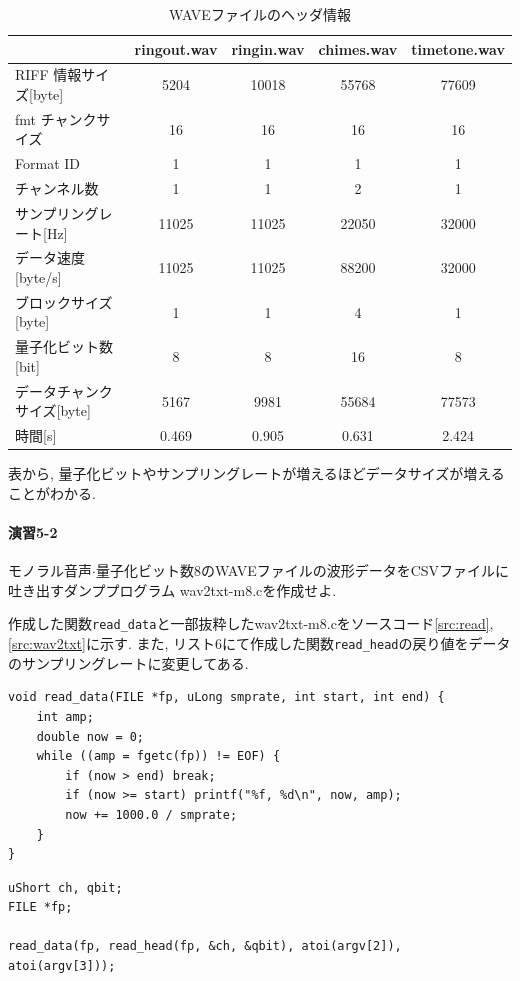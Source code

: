 \documentclass[titlepage]{jsarticle}
\begin{document}
        \begin{table}[ht]
            \centering
            \caption{WAVEファイルのヘッダ情報}
            \label{tab:header}
            \begin{tabular}{l||c|c|c|c} \hline
                                       & ringout.wav   & ringin.wav & chimes.wav & timetone.wav \\ \hline
                RIFF 情報サイズ[byte]    & 5204  & 10018 & 55768 & 77609 \\
                fmt チャンクサイズ       & 16    & 16 & 16 & 16 \\
                Format ID              & 1     & 1   & 1 & 1 \\
                チャンネル数             & 1     & 1 & 2 & 1 \\
                サンプリングレート[Hz]    & 11025 & 11025 & 22050 & 32000 \\
                データ速度[byte/s]       & 11025 & 11025 & 88200 & 32000 \\
                ブロックサイズ[byte]      & 1     & 1 & 4 & 1 \\
                量子化ビット数[bit]       & 8     & 8 & 16 & 8 \\
                データチャンクサイズ[byte] & 5167  & 9981 & 55684 & 77573 \\
                時間[s] & 0.469 & 0.905 & 0.631 & 2.424 \\ \hline
            \end{tabular}
        \end{table}

        表から, 量子化ビットやサンプリングレートが増えるほどデータサイズが増えることがわかる. 

    \paragraph{演習5-2} モノラル音声$\cdot$量子化ビット数8のWAVEファイルの波形データをCSVファイルに吐き出すダンププログラム
    wav2txt-m8.cを作成せよ.

        作成した関数\verb|read_data|と一部抜粋したwav2txt-m8.cをソースコード\ref{src:read},
        \ref{src:wav2txt}に示す.
        また, リスト6にて作成した関数\verb|read_head|の戻り値をデータのサンプリングレートに変更してある.

            \begin{lstlisting}[caption=read\_data.c, label=src:read]
void read_data(FILE *fp, uLong smprate, int start, int end) {
    int amp;
    double now = 0;
    while ((amp = fgetc(fp)) != EOF) {
        if (now > end) break;
        if (now >= start) printf("%f, %d\n", now, amp);
        now += 1000.0 / smprate;
    }
}\end{lstlisting}
            \begin{lstlisting}[caption=wav2txt-m8.c, label=src:wav2txt]
uShort ch, qbit;
FILE *fp;

read_data(fp, read_head(fp, &ch, &qbit), atoi(argv[2]), atoi(argv[3]));\end{lstlisting}
\end{document}
